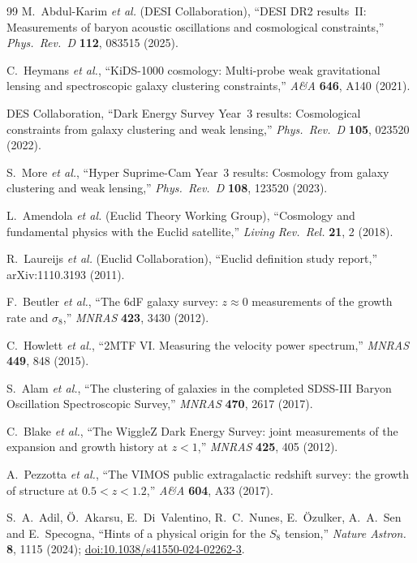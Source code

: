 \documentclass[aps,prd,twocolumn,nofootinbib,floatfix,superscriptaddress]{revtex4-2}
\begin{document}
\begin{thebibliography}{99}
 M.~Abdul-Karim \emph{et al.} (DESI Collaboration),
``DESI DR2 results~II: Measurements of baryon acoustic oscillations
and cosmological constraints,'' \textit{Phys.~Rev.~D} \textbf{112},
083515 (2025).

 C.~Heymans \emph{et al.}, ``KiDS-1000 cosmology:
Multi-probe weak gravitational lensing and spectroscopic galaxy
clustering constraints,'' \textit{A\&A} \textbf{646}, A140 (2021).

 DES Collaboration, ``Dark Energy Survey Year~3
results: Cosmological constraints from galaxy clustering and weak
lensing,'' \textit{Phys.~Rev.~D} \textbf{105}, 023520 (2022).

 S.~More \emph{et al.}, ``Hyper Suprime-Cam Year~3
results: Cosmology from galaxy clustering and weak lensing,''
\textit{Phys.~Rev.~D} \textbf{108}, 123520 (2023).

 L.~Amendola \emph{et al.} (Euclid
Theory Working Group), ``Cosmology and fundamental physics with the
Euclid satellite,'' \textit{Living Rev.~Rel.} \textbf{21}, 2 (2018).

 R.~Laureijs \emph{et al.} (Euclid Collaboration),
``Euclid definition study report,'' arXiv:1110.3193 (2011).


 F.~Beutler \emph{et al.}, ``The 6dF galaxy
survey: $z\approx 0$ measurements of the growth rate and $\sigma_8$,''
\textit{MNRAS} \textbf{423}, 3430 (2012).

 C.~Howlett \emph{et al.}, ``2MTF VI.
Measuring the velocity power spectrum,''
\textit{MNRAS} \textbf{449}, 848 (2015).

 S.~Alam \emph{et al.}, ``The clustering of
galaxies in the completed SDSS-III Baryon Oscillation Spectroscopic
Survey,'' \textit{MNRAS} \textbf{470}, 2617 (2017).

 C.~Blake \emph{et al.}, ``The WiggleZ Dark
Energy Survey: joint measurements of the expansion and growth history
at $z<1$,'' \textit{MNRAS} \textbf{425}, 405 (2012).

 A.~Pezzotta \emph{et al.}, ``The VIMOS
public extragalactic redshift survey: the growth of structure at
$0.5<z<1.2$,'' \textit{A\&A} \textbf{604}, A33 (2017).

 S.~A.~Adil, \"O.~Akarsu, E.~Di~Valentino,
R.~C.~Nunes, E.~\"Ozulker, A.~A.~Sen and E.~Specogna, ``Hints of
a physical origin for the $S_8$ tension,''
\textit{Nature Astron.} \textbf{8}, 1115 (2024);
\href{https://doi.org/10.1038/s41550-024-02262-3}{doi:10.1038/s41550-024-02262-3}.


\end{thebibliography}
\end{document}

